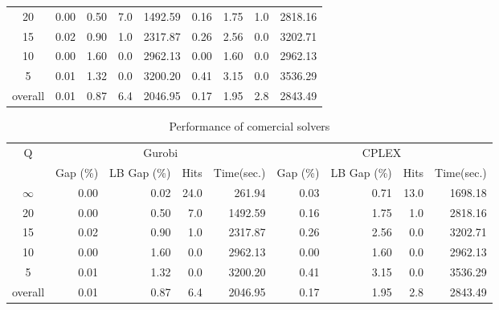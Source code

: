 \begin{table}[H]
\begin{tabular}{c rrrr rrrr}
      20 &     0.00 &        0.50 &  7.0 &    1492.59 &     0.16 &        1.75 &  1.0 &    2818.16 \\
      15 &     0.02 &        0.90 &  1.0 &    2317.87 &     0.26 &        2.56 &  0.0 &    3202.71 \\
      10 &     0.00 &        1.60 &  0.0 &    2962.13 &     0.00 &        1.60 &  0.0 &    2962.13 \\
       5 &     0.01 &        1.32 &  0.0 &    3200.20 &     0.41 &        3.15 &  0.0 &    3536.29 \\
\midrule
 overall &     0.01 &        0.87 &  6.4 &    2046.95 &     0.17 &        1.95 &  2.8 &    2843.49 \\
\bottomrule
\end{tabular}
\end{table}\begin{table}[H]
\centering
\caption{Performance of comercial solvers}
\label{tab:solvers_results}
\begin{tabular}{c rrrr rrrr}
\toprule
       Q & \multicolumn{4}{c}{Gurobi} & \multicolumn{4}{c}{CPLEX} \\
         & Gap (\%) & LB Gap (\%) & Hits & Time(sec.) & Gap (\%) & LB Gap (\%) & Hits & Time(sec.) \\
\midrule
$\infty$ &     0.00 &        0.02 & 24.0 &     261.94 &     0.03 &        0.71 & 13.0 &    1698.18 \\
      20 &     0.00 &        0.50 &  7.0 &    1492.59 &     0.16 &        1.75 &  1.0 &    2818.16 \\
      15 &     0.02 &        0.90 &  1.0 &    2317.87 &     0.26 &        2.56 &  0.0 &    3202.71 \\
      10 &     0.00 &        1.60 &  0.0 &    2962.13 &     0.00 &        1.60 &  0.0 &    2962.13 \\
       5 &     0.01 &        1.32 &  0.0 &    3200.20 &     0.41 &        3.15 &  0.0 &    3536.29 \\
\midrule
 overall &     0.01 &        0.87 &  6.4 &    2046.95 &     0.17 &        1.95 &  2.8 &    2843.49 \\
\bottomrule
\end{tabular}
\end{table}